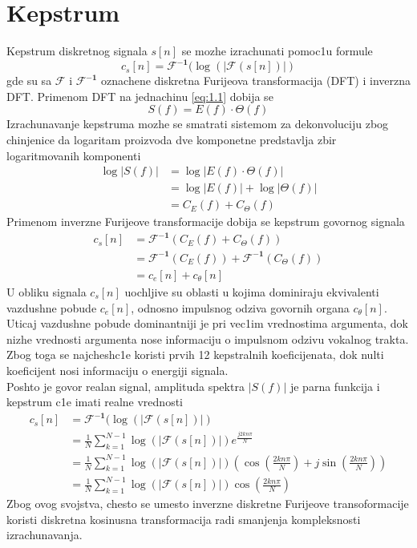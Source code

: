 \documentclass[a4paper, openany, oneside, 11pt]{book}
\begin{document}
\section{Kepstrum}
Kepstrum diskretnog signala $s[n]$ se mozhe izrachunati pomoc1u formule \cite{kepstrum}
\begin{equation}
c_s[n] = \boldsymbol{\mathcal{F}^{-1}}(\log(|\boldsymbol{\mathcal{F}}(s[n])|)
\end{equation}
gde su sa $\boldsymbol{\mathcal{F}}$ i $\boldsymbol{\mathcal{F}^{-1}}$ oznachene diskretna Furijeova transformacija (DFT) i inverzna DFT. Primenom DFT na jednachinu \ref{eq:1.1} dobija se
\begin{equation}
S(f) = E(f)\cdot\Theta(f)
\end{equation}
Izrachunavanje kepstruma mozhe se smatrati sistemom za dekonvoluciju zbog chinjenice da logaritam proizvoda dve komponetne predstavlja zbir logaritmovanih komponenti
\begin{align}
\log|S(f)| &= \log|E(f)\cdot\Theta(f)|\\
           &= \log|E(f)| + \log|\Theta(f)|\\
           &= C_E(f)+ C_{\Theta}(f)
\end{align}
Primenom inverzne Furijeove transformacije dobija se kepstrum govornog signala
\begin{align}
c_s[n] &= \boldsymbol{\mathcal{F}^{-1}}(C_E(f)+ C_{\Theta}(f))\\
       &= \boldsymbol{\mathcal{F}^{-1}}(C_E(f))+
       	  \boldsymbol{\mathcal{F}^{-1}}(C_{\Theta}(f))\\
       &= c_e[n]+ c_{\theta}[n]
\end{align}
U obliku signala $c_s[n]$ uochljive su oblasti u kojima dominiraju ekvivalenti vazdushne pobude  $c_e[n]$, odnosno impulsnog odziva govornih organa $c_{\theta}[n]$. Uticaj vazdushne pobude dominantniji je pri vec1im vrednostima argumenta, dok nizhe vrednosti argumenta nose informaciju o impulsnom odzivu vokalnog trakta. Zbog toga se najchesh\-c1e koristi prvih 12 kepstralnih koeficijenata, dok nulti koeficijent nosi informaciju o energiji signala.\\
Poshto je govor realan signal, amplituda spektra $|S(f)|$ je parna funkcija i kepstrum c1e imati realne vrednosti
\begin{align}
c_s[n] &= \boldsymbol{\mathcal{F}^{-1}}(\log(|\boldsymbol{\mathcal{F}}(s[n])|)\\
&=\frac{1}{N}\sum^{N-1}_{k=1}\log(|\boldsymbol{\mathcal{F}}(s[n])|)e^{\frac{j2kn\pi}{N}}\\
&=\frac{1}{N}\sum^{N-1}_{k=1}\log(|\boldsymbol{\mathcal{F}}(s[n])|)(\cos\left(\frac{2kn\pi}{N}\right)+j\sin\left(\frac{2kn\pi}{N}\right))\\
&=\frac{1}{N}\sum^{N-1}_{k=1}\log(|\boldsymbol{\mathcal{F}}(s[n])|)\cos\left(\frac{2kn\pi}{N}\right)
\end{align}
Zbog ovog svojstva, chesto se umesto inverzne diskretne Furijeove transoformacije koristi diskretna kosinusna transformacija radi smanjenja kompleksnosti izrachunavanja.
\end{document}
